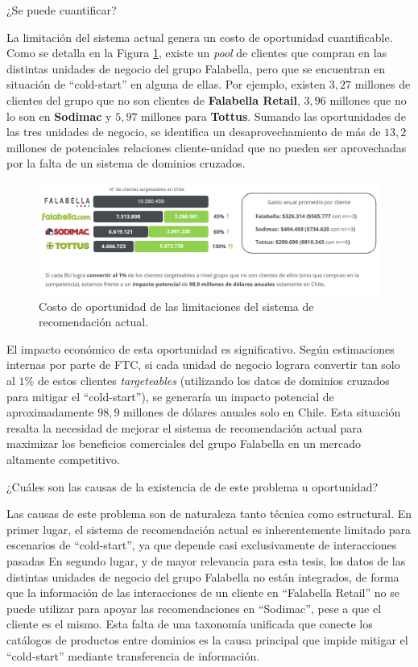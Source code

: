 ¿Se puede cuantificar?

La limitación del sistema actual genera un costo de oportunidad cuantificable. Como se detalla en la Figura \ref{fig:Limitaciones_Sistema_Actual}, existe un \textit{pool} de clientes que compran en las distintas unidades de negocio del grupo Falabella, pero que se encuentran en situación de \enquote{cold-start} en alguna de ellas. Por ejemplo, existen $3,27$ millones de clientes del grupo que no son clientes de \textbf{Falabella Retail}, $3,96$ millones que no lo son en \textbf{Sodimac} y $5,97$ millones para \textbf{Tottus}. Sumando las oportunidades de las tres unidades de negocio, se identifica un desaprovechamiento de más de $13,2$ millones de potenciales relaciones cliente-unidad que no pueden ser aprovechadas por la falta de un sistema de dominios cruzados.

\begin{figure}[th]
	\centering
	\includegraphics[width=\textwidth]{Figures/grafica Matias.png}
	\caption{Costo de oportunidad de las limitaciones del sistema de recomendación actual.}
	\label{fig:Limitaciones_Sistema_Actual}
\end{figure}

El impacto económico de esta oportunidad es significativo. Según estimaciones internas por parte de FTC, si cada unidad de negocio lograra convertir tan solo al $1\%$ de estos clientes \textit{targeteables} (utilizando los datos de dominios cruzados para mitigar el \enquote{cold-start}), se generaría un impacto potencial de aproximadamente $98,9$ millones de dólares anuales solo en Chile. Esta situación resalta la necesidad de mejorar el sistema de recomendación actual para maximizar los beneficios comerciales del grupo Falabella en un mercado altamente competitivo.


¿Cuáles son las causas de la existencia de de este problema u oportunidad?

Las causas de este problema son de naturaleza tanto técnica como estructural. En primer lugar, el sistema de recomendación actual es inherentemente limitado para escenarios de \enquote{cold-start}, ya que depende casi exclusivamente de interacciones pasadas %
En segundo lugar, y de mayor relevancia para esta tesis, los datos de las distintas unidades de negocio del grupo Falabella no están integrados, de forma que la información de las interacciones de un cliente en \enquote{Falabella Retail} no se puede utilizar para apoyar las recomendaciones en \enquote{Sodimac}, pese a que el cliente es el mismo. Esta falta de una taxonomía unificada que conecte los catálogos de productos entre dominios es la causa principal que impide mitigar el \enquote{cold-start} mediante transferencia de información. %

